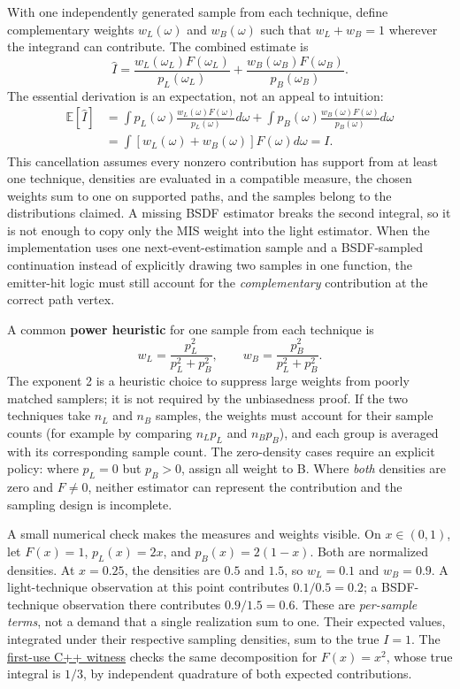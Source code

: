 With one independently generated sample from each technique, define complementary weights \(w_L(\omega)\) and \(w_B(\omega)\) such that \(w_L+w_B=1\) wherever the integrand can contribute. The combined estimate is \[
\widehat I=
 \frac{w_L(\omega_L)F(\omega_L)}{p_L(\omega_L)}
 +\frac{w_B(\omega_B)F(\omega_B)}{p_B(\omega_B)}.
\] The essential derivation is an expectation, not an appeal to intuition: \[
\begin{aligned}
\mathbb E[\widehat I]
&=\int p_L(\omega)\frac{w_L(\omega)F(\omega)}{p_L(\omega)}d\omega+
  \int p_B(\omega)\frac{w_B(\omega)F(\omega)}{p_B(\omega)}d\omega\\
&=\int [w_L(\omega)+w_B(\omega)]F(\omega)d\omega
=I.
\end{aligned}
\] This cancellation assumes every nonzero contribution has support from at least one technique, densities are evaluated in a compatible measure, the chosen weights sum to one on supported paths, and the samples belong to the distributions claimed. A missing BSDF estimator breaks the second integral, so it is not enough to copy only the MIS weight into the light estimator. When the implementation uses one next-event-estimation sample and a BSDF-sampled continuation instead of explicitly drawing two samples in one function, the emitter-hit logic must still account for the \emph{complementary} contribution at the correct path vertex.

A common \textbf{power heuristic} for one sample from each technique is \[
w_L=\frac{p_L^2}{p_L^2+p_B^2},\qquad
w_B=\frac{p_B^2}{p_L^2+p_B^2}.
\] The exponent 2 is a heuristic choice to suppress large weights from poorly matched samplers; it is not required by the unbiasedness proof. If the two techniques take \(n_L\) and \(n_B\) samples, the weights must account for their sample counts (for example by comparing \(n_Lp_L\) and \(n_Bp_B\)), and each group is averaged with its corresponding sample count. The zero-density cases require an explicit policy: where \(p_L=0\) but \(p_B>0\), assign all weight to B. Where \emph{both} densities are zero and \(F\ne0\), neither estimator can represent the contribution and the sampling design is incomplete.

A small numerical check makes the measures and weights visible. On \(x\in(0,1)\), let \(F(x)=1\), \(p_L(x)=2x\), and \(p_B(x)=2(1-x)\). Both are normalized densities. At \(x=0.25\), the densities are \(0.5\) and \(1.5\), so \(w_L=0.1\) and \(w_B=0.9\). A light-technique observation at this point contributes \(0.1/0.5=0.2\); a BSDF-technique observation there contributes \(0.9/1.5=0.6\). These are \emph{per-sample terms}, not a demand that a single realization sum to one. Their expected values, integrated under their respective sampling densities, sum to the true \(I=1\). The \hyperref[source-file-a41016f2e326b40cdff18ff4]{first-use C++ witness} checks the same decomposition for \(F(x)=x^2\), whose true integral is \(1/3\), by independent quadrature of both expected contributions.

